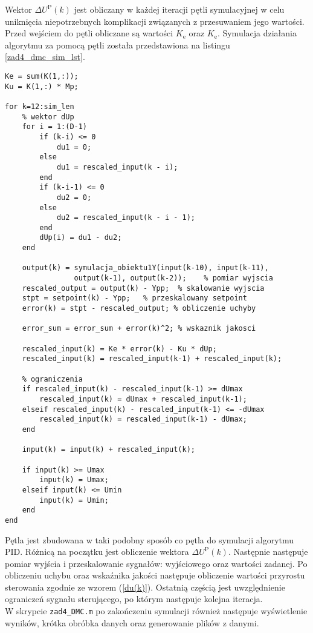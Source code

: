 Wektor $\Delta U^{\mathrm{P}}(k)$ jest obliczany w każdej iteracji pętli symulacyjnej w celu uniknięcia niepotrzebnych komplikacji związanych z przesuwaniem jego wartości. Przed wejściem do pętli obliczane są wartości $K_{\mathrm{e}}$ oraz $K_{\mathrm{e}}$. Symulacja działania algorytmu za pomocą pętli została przedstawiona na listingu \ref{zad4_dmc_sim_lst}.\\

\begin{lstlisting}[style=custommatlab,frame=single,label={zad4_dmc_sim_lst},caption={Pętla symulująca działanie regulatora DMC},captionpos=b]
Ke = sum(K(1,:));
Ku = K(1,:) * Mp;

for k=12:sim_len    
    % wektor dUp
    for i = 1:(D-1)
        if (k-i) <= 0
            du1 = 0;
        else
            du1 = rescaled_input(k - i);
        end
        if (k-i-1) <= 0
            du2 = 0;
        else
            du2 = rescaled_input(k - i - 1);
        end 
        dUp(i) = du1 - du2;
    end
    
    output(k) = symulacja_obiektu1Y(input(k-10), input(k-11),
    			output(k-1), output(k-2));    % pomiar wyjscia
    rescaled_output = output(k) - Ypp;  % skalowanie wyjscia   
    stpt = setpoint(k) - Ypp;   % przeskalowany setpoint
    error(k) = stpt - rescaled_output; % obliczenie uchyby   
    
    error_sum = error_sum + error(k)^2; % wskaznik jakosci
    
    rescaled_input(k) = Ke * error(k) - Ku * dUp;
    rescaled_input(k) = rescaled_input(k-1) + rescaled_input(k);
    
    % ograniczenia  
    if rescaled_input(k) - rescaled_input(k-1) >= dUmax
        rescaled_input(k) = dUmax + rescaled_input(k-1);
    elseif rescaled_input(k) - rescaled_input(k-1) <= -dUmax
        rescaled_input(k) = rescaled_input(k-1) - dUmax;
    end   
    
    input(k) = input(k) + rescaled_input(k);  
    
    if input(k) >= Umax
        input(k) = Umax;
    elseif input(k) <= Umin
        input(k) = Umin;
    end 
end
\end{lstlisting}

Pętla jest zbudowana w taki podobny sposób co pętla do symulacji algorytmu PID. Różnicą na początku jest obliczenie wektora $\Delta U^{\mathrm{P}}(k)$. Następnie następuje pomiar wyjścia i przeskalowanie sygnałów: wyjściowego oraz wartości zadanej. Po obliczeniu uchybu oraz wskaźnika jakości następuje obliczenie wartości przyrostu sterowania zgodnie ze wzorem (\ref{du(k)}). Ostatnią częścią jest uwzględnienie ograniczeń sygnału sterującego, po którym następuje kolejna iteracja.\\
\indent{} W skrypcie \verb+zad4_DMC.m+ po zakończeniu symulacji również następuje wyświetlenie wyników, krótka obróbka danych oraz generowanie plików z danymi.


